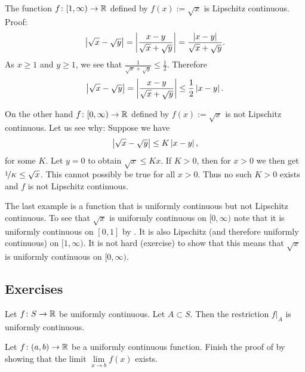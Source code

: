 \begin{example}
The function $f \colon [1,\infty) \to {\mathbb{R}}$ defined by $f(x) := \sqrt{x}$
is Lipschitz continuous. Proof:
\begin{equation*}
\left\lvert {\sqrt{x}-\sqrt{y}} \right\rvert = 
\left\lvert {\frac{x-y}{\sqrt{x}+\sqrt{y}}} \right\rvert
=
\frac{\left\lvert {x-y} \right\rvert}{\sqrt{x}+\sqrt{y}} .
\end{equation*}
As $x \geq 1$ and $y \geq 1$, we see that $\frac{1}{\sqrt{x}+\sqrt{y}}
\leq \frac{1}{2}$.  Therefore
\begin{equation*}
\left\lvert {\sqrt{x}-\sqrt{y}} \right\rvert = 
\left\lvert {\frac{x-y}{\sqrt{x}+\sqrt{y}}} \right\rvert
\leq
\frac{1}{2}
\left\lvert {x-y} \right\rvert.
\end{equation*}

On the other hand $f \colon [0,\infty) \to {\mathbb{R}}$ defined by
$f(x) := \sqrt{x}$ is not Lipschitz continuous.  Let us see why:
Suppose we have
\begin{equation*}
\left\lvert {\sqrt{x}-\sqrt{y}} \right\rvert 
\leq
K \left\lvert {x-y} \right\rvert ,
\end{equation*}
for some $K$.  Let $y=0$ to obtain
$\sqrt{x} \leq K x$.   If $K > 0$, then for $x > 0$ we then get
$\nicefrac{1}{K} \leq \sqrt{x}$.  This cannot possibly be true for all
$x > 0$.  Thus no such $K > 0$ exists and $f$ is not
Lipschitz continuous.

The last example is a function that is uniformly
continuous but not Lipschitz continuous.  To see that $\sqrt{x}$
is
uniformly continuous on $[0,\infty)$ note that it is uniformly continuous on
$[0,1]$ by .  It is also Lipschitz (and
therefore uniformly continuous) on $[1,\infty)$.  It is not hard (exercise)
to show that this means that $\sqrt{x}$ is uniformly continuous on
$[0,\infty)$.
\end{example}

\subsection{Exercises}

\begin{exercise}
Let $f \colon S \to {\mathbb{R}}$ be uniformly continuous.  Let $A \subset S$.
Then the restriction $f|_A$ is uniformly continuous.
\end{exercise}

\begin{exercise}
Let $f \colon (a,b) \to {\mathbb{R}}$ be a uniformly continuous function.
Finish the proof of  by showing that
the limit
$\lim\limits_{x \to b} f(x)$
exists.
\end{exercise}

